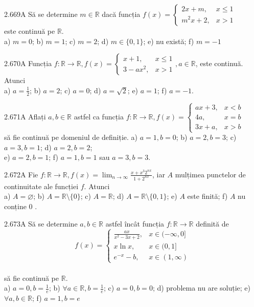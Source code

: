 \documentclass[11pt]{article}
\begin{document}
2.669A Să se determine $m \in \mathbb{R}$ dacă funcția $f(x)= \begin{cases}2 x+m, & x \leq 1 \\ m^{2} x+2, & x>1\end{cases}$\\este continuă pe $\mathbb{R}$.\\ a) $m=0$; b) $m=1$; c) $m=2$; d) $m \in\{0,1\}$; e) nu există; f) $m=-1$

2.670A Funcția $f: \mathbb{R} \rightarrow \mathbb{R}, f(x)=\left\{\begin{array}{cc}x+1, & x \leq 1 \\ 3-a x^{2}, & x>1\end{array}, a \in \mathbb{R}\right.$, este continuă. Atunci\\ a) $a=\frac{1}{2}$; b) $a=2$; c) $a=0$; d) $a=\sqrt{2}$; e) $a=1$; f) $a=-1$. 

2.671A Aflați $a, b \in \mathbb{R}$ astfel ca funcția $f: \mathbb{R} \rightarrow \mathbb{R}, f(x)= \begin{cases}a x+3, & x<b \\ 4 a, & x=b \\ 3 x+a, & x>b\end{cases}$\\să fie continuă pe domeniul de definiție. a) $a=1, b=0$; b) $a=2, b=3$; c) $a=3, b=1$; d) $a=2, b=2$;\\ e) $a=2, b=1$; f) $a=1, b=1$ sau $a=3, b=3$.

2.672A Fie $f: \mathbb{R} \rightarrow \mathbb{R}, f(x)=\lim _{n \rightarrow \infty} \frac{x+x^{3} 2^{n x}}{1+2^{n x}}$, iar $A$ mulțimea punctelor de continuitate ale funcției $f$. Atunci\\ a) $A=\varnothing$; b) $A=\mathbb{R} \setminus\{0\}$; c) $A=\mathbb{R}$; d) $A=\mathbb{R} \setminus\{0,1\}$; e) $A$ este finită; f) $A$ nu conține 0 .

2.673A Să se determine $a, b \in \mathbb{R}$ astfel încât funcția $f: \mathbb{R} \rightarrow \mathbb{R}$ definită de $$f(x)= \begin{cases}\frac{a x}{x^{2}-3 x+2}, & x \in(-\infty, 0] \\ x \ln x, & x \in(0,1] \\ e^{-x}-b, & x \in(1, \infty)\end{cases}$$\\să fie continuă pe $\mathbb{R}$.\\ a) $a=0, b=\frac{1}{e}$; b) $\forall a \in \mathbb{R}, b=\frac{1}{e}$; c) $a=0, b=0$; d) problema nu are soluție; e) $\forall a, b \in \mathbb{R}$; f) $a=1, b=e$
\end{document}
